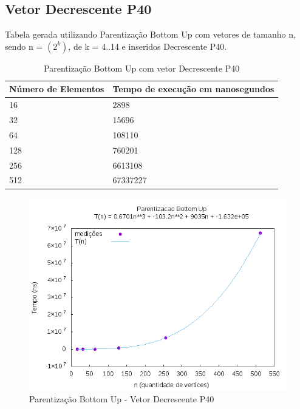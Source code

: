 \documentclass[12pt,a4paper,twoside]{report}
\begin{document}
\subsection{Vetor Decrescente P40}
Tabela gerada utilizando Parentização Bottom Up com vetores de tamanho n, sendo n = $(2^k)$, de k = 4..14 e inseridos Decrescente P40.
\begin{table}[H]
\centering
\caption{Parentização Bottom Up com vetor Decrescente P40}
\label{my-label}
\begin{tabular}{|l|l|}
\hline
\multicolumn{1}{|c|}{\textbf{Número de Elementos}} & \multicolumn{1}{c|}{\textbf{Tempo de execução em nanosegundos}} \\ \hline
16 & 2898 \\ \hline
32 & 15696 \\ \hline
64 & 108110 \\ \hline
128 & 760201 \\ \hline
256 & 6613108 \\ \hline
512 & 67337227 \\ \hline
\end{tabular}
\end{table}

\begin{figure}[H]
    \centering
    \includegraphics[width=0.7\linewidth]{graficos/Parentizacao BottomUp/Decrescente P40/ParentizacaoBottomUp.png}
  \caption{Parentização Bottom Up - Vetor Decrescente P40}
\end{figure}
\end{document}
